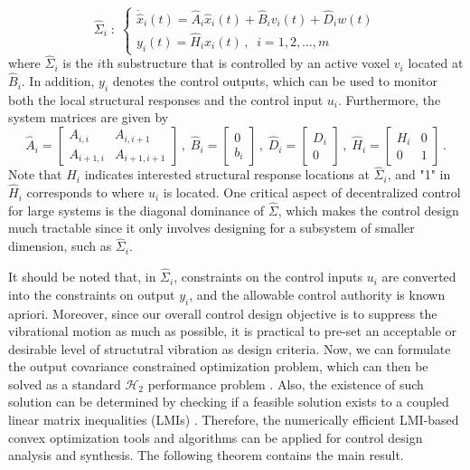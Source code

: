 \documentclass[11pt]{ucthesis}
\begin{document}
\begin{equation}
\hat{\Sigma}_i\;:\; \left \{
\begin{array}{l}
\dot{\hat{x}}_i (t) = \hat{A}_i \hat{x}_i (t) + \hat{B}_i v_i (t) + \hat{D}_i w(t) \\
y_i (t) = \hat{H}_i x_i (t) \,,\;\; i = 1,2,\dots, m
\end{array}
\right .
\label{eqn:sys}
\end{equation}
where $\hat{\Sigma}_i$ is the $i$th substructure that is controlled by an active voxel $v_i$ located at $\hat{B}_i$. In addition, $y_i$ denotes the control outputs, which can be used to monitor both the local structural responses and the control input $u_i$. Furthermore, the system matrices are given by
\[
\hat{A}_i = \left [
\begin{array}{cc}
A_{i,i} & A_{i,i+1} \\
A_{i+1,i} & A_{i+1,i+1}
\end{array}
\right ] \,,\;\hat{B}_i = \left [
\begin{array}{c}
0 \\
b_i
\end{array}
\right ] \,,\;\hat{D}_i = \left [
\begin{array}{c}
D_i \\
0
\end{array}
\right ] \,,\;\hat{H}_i = \left [
\begin{array}{cc}
H_i & 0 \\
0& 1
\end{array}
\right ] \,.
\]
Note that $H_i$ indicates interested structural response locations at $\hat{\Sigma}_i$, and "1" in $\hat{H}_i$ corresponds to where $u_i$ is located. One critical aspect of decentralized control for large systems is the diagonal dominance of $\hat{\Sigma}$, which makes the control design much tractable since it only involves designing for a subsystem of smaller dimension, such as $\hat{\Sigma}_i$. 

It should be noted that, in $\hat{\Sigma}_i$, constraints on the control inputs $u_i$ are converted into the constraints on output $y_i$, and the allowable control authority is known apriori. Moreover, since our overall control design objective is to suppress the vibrational motion as much as possible, it is practical to pre-set an acceptable or desirable level of structutral vibration as design criteria. Now, we can formulate the output covariance constrained optimization problem, which can then be solved as a standard $\mathcal{H}_2$ performance problem \cite{zhu1997convergent}. Also, the existence of such solution can be determined by checking if a feasible solution exists to a coupled linear matrix inequalities (LMIs) \cite{swei2015lmi}. Therefore, the numerically efficient LMI-based convex optimization tools and algorithms can be applied for control design analysis and synthesis. The following theorem contains the main result.
\end{document}
